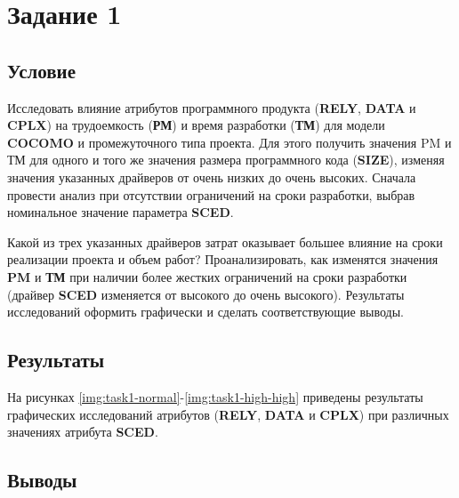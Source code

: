 \section{Задание 1}

\subsection{Условие}

Исследовать влияние атрибутов программного продукта (\textbf{RELY}, \textbf{DATA} и \textbf{CPLX}) на трудоемкость (\textbf{РМ}) и время разработки (\textbf{ТМ}) для модели \textbf{COCOMO} и промежуточного типа проекта. Для этого получить значения PM и ТМ для одного и того же значения размера программного кода (\textbf{SIZE}), изменяя значения указанных драйверов от очень низких до очень высоких. Сначала провести анализ при отсутствии ограничений на сроки разработки, выбрав номинальное значение параметра \textbf{SCED}. 

Какой из трех указанных драйверов затрат оказывает большее влияние на сроки реализации проекта и объем работ? Проанализировать, как изменятся значения \textbf{PM} и \textbf{ТМ} при наличии более жестких ограничений на сроки разработки (драйвер \textbf{SCED} изменяется от высокого до очень высокого). Результаты исследований оформить графически и сделать соответствующие выводы.


\subsection{Результаты}

На рисунках \ref{img:task1-normal}-\ref{img:task1-high-high} приведены результаты графических исследований атрибутов (\textbf{RELY}, \textbf{DATA} и \textbf{CPLX}) при различных значениях атрибута \textbf{SCED}.


\clearpage
\subsection{Выводы}

